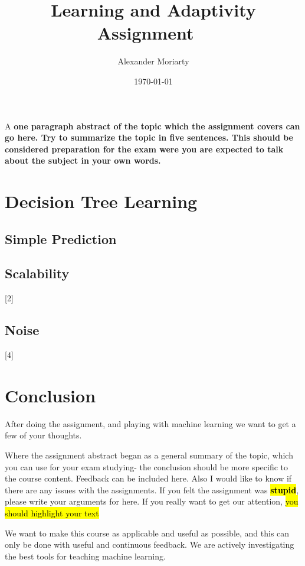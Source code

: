 \documentclass[	DIV=calc,%
				paper=a4,%
				fontsize=11pt,%
				twocolumn]{scrartcl}	 %
\title{Learning and Adaptivity
\\ Assignment ~\upperRomannumeral{1}}%
\author{Alexander Moriarty }	%
\date{\today}
\newcommand{\initial}[1]{%
     \lettrine[lines=3,lhang=0.3,nindent=0em]{
     				\color{brsublue}
     				{\textsf{#1}}}{}}
\begin{document}
\maketitle
\thispagestyle{fancy} %
\initial{A}\textbf{ one paragraph abstract of the topic which the assignment covers can go here. Try to summarize the topic in five sentences. This should be considered preparation for the exam were you are expected to talk about the subject in your own words.}


\setcounter{section}{5}
\section{Decision Tree Learning}
\subsection{Simple Prediction}

\blindenumerate[4]

\subsection{Scalability}

[2]

\subsection{Noise}

[4]

\vfill

\section*{Conclusion}

After doing the assignment, and playing with machine learning we want to get a few of your thoughts. 

Where the assignment abstract began as a general summary of the topic, which you can use for your exam studying- the conclusion should be more specific to the course content. Feedback can be included here. Also I would like to know if there are any issues with the assignments. If you felt the assignment was \textbf{\hl{stupid}}, please write your arguments for here.  If you really want to get our attention, \hl{you should highlight your text} 

We want to make this course as applicable and useful as possible, and this can only be done with useful and continuous feedback. We are actively investigating the best tools for teaching machine learning. 
\end{document}
